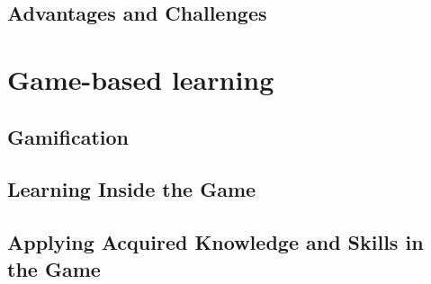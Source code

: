 \subsection{Advantages and Challenges}



\section{Game-based learning}
\label{sec:game_based_learning}

\subsection{Gamification}


\subsection{Learning Inside the Game}


\subsection{Applying Acquired Knowledge and Skills in the Game}

